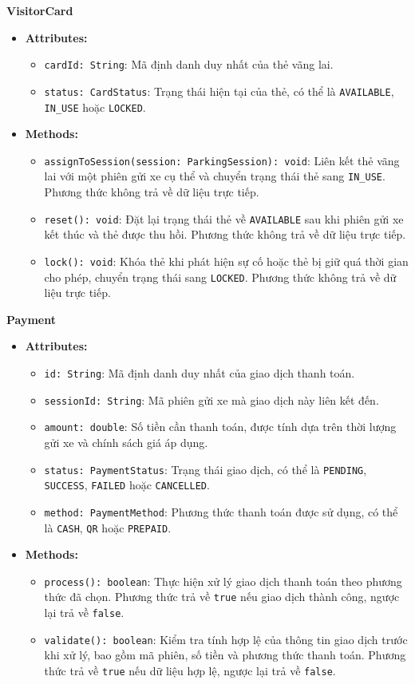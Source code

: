 \noindent\textbf{VisitorCard}
\begin{itemize}
	\item \textbf{Attributes:}
	\begin{itemize}
		\item \texttt{cardId: String}: Mã định danh duy nhất của thẻ vãng lai.
		\item \texttt{status: CardStatus}: Trạng thái hiện tại của thẻ, có thể là \texttt{AVAILABLE}, \texttt{IN\_USE} hoặc \texttt{LOCKED}.
	\end{itemize}
	\item \textbf{Methods:}
	\begin{itemize}
		\item \texttt{assignToSession(session: ParkingSession): void}: Liên kết thẻ vãng lai với một phiên gửi xe cụ thể và chuyển trạng thái thẻ sang \texttt{IN\_USE}. Phương thức không trả về dữ liệu trực tiếp.
		\item \texttt{reset(): void}: Đặt lại trạng thái thẻ về \texttt{AVAILABLE} sau khi phiên gửi xe kết thúc và thẻ được thu hồi. Phương thức không trả về dữ liệu trực tiếp.
		\item \texttt{lock(): void}: Khóa thẻ khi phát hiện sự cố hoặc thẻ bị giữ quá thời gian cho phép, chuyển trạng thái sang \texttt{LOCKED}. Phương thức không trả về dữ liệu trực tiếp.
	\end{itemize}
\end{itemize}

\noindent\textbf{Payment}
\begin{itemize}
	\item \textbf{Attributes:}
	\begin{itemize}
		\item \texttt{id: String}: Mã định danh duy nhất của giao dịch thanh toán.
		\item \texttt{sessionId: String}: Mã phiên gửi xe mà giao dịch này liên kết đến.
		\item \texttt{amount: double}: Số tiền cần thanh toán, được tính dựa trên thời lượng gửi xe và chính sách giá áp dụng.
		\item \texttt{status: PaymentStatus}: Trạng thái giao dịch, có thể là \texttt{PENDING}, \texttt{SUCCESS}, \texttt{FAILED} hoặc \texttt{CANCELLED}.
		\item \texttt{method: PaymentMethod}: Phương thức thanh toán được sử dụng, có thể là \texttt{CASH}, \texttt{QR} hoặc \texttt{PREPAID}.
	\end{itemize}
	\item \textbf{Methods:}
	\begin{itemize}
		\item \texttt{process(): boolean}: Thực hiện xử lý giao dịch thanh toán theo phương thức đã chọn. Phương thức trả về \texttt{true} nếu giao dịch thành công, ngược lại trả về \texttt{false}.
		\item \texttt{validate(): boolean}: Kiểm tra tính hợp lệ của thông tin giao dịch trước khi xử lý, bao gồm mã phiên, số tiền và phương thức thanh toán. Phương thức trả về \texttt{true} nếu dữ liệu hợp lệ, ngược lại trả về \texttt{false}.
	\end{itemize}
\end{itemize}

